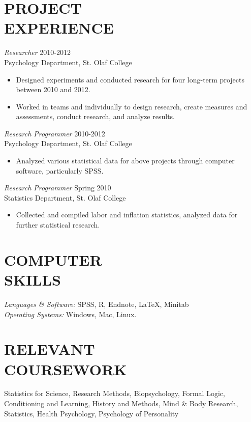 \documentclass[line,margin]{res}
\begin{document}
\begin{resume}
 \section{PROJECT\\EXPERIENCE} {\sl Researcher} \hfill 2010-2012 \\
                Psychology Department, St. Olaf College
                 \begin{itemize}  \itemsep -2pt %
                 \item Designed experiments and conducted research for four long-term projects between 2010 and 2012.
                 \item Worked in teams and individually to design research, create measures and assessments, conduct research, and analyze results. 		
               
                \end{itemize}
                
                {\sl Research Programmer} \hfill            2010-2012 \\
                Psychology Department, St. Olaf College 
                 \begin{itemize}  \itemsep -2pt %
                 \item Analyzed various statistical data for above projects through computer software, particularly SPSS. 
                 \end{itemize} 

                {\sl Research Programmer} \hfill           Spring 2010 \\
                Statistics Department, St. Olaf College 
                 \begin{itemize}  \itemsep -2pt %
                 \item Collected and compiled labor and inflation statistics, analyzed data for further statistical research. 
                 \end{itemize}  
\section{COMPUTER \\ SKILLS} {\sl Languages \& Software:} SPSS, R, Endnote, LaTeX, Minitab\\
                {\sl Operating Systems:} Windows, Mac, Linux.
\section{RELEVANT \\ COURSEWORK} Statistics for Science, Research Methods, Biopsychology, Formal Logic, Conditioning and Learning, History and Methods, Mind \& Body Research, Statistics, Health Psychology, Psychology of Personality

\end{resume}
\end{document}
